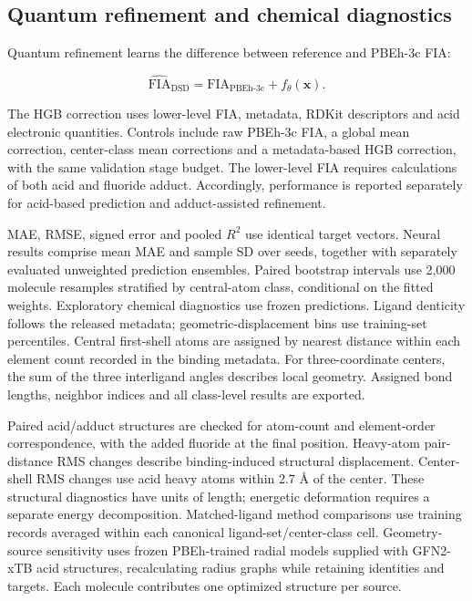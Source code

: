\subsection{Quantum refinement and chemical diagnostics}

Quantum refinement learns the difference between reference and PBEh-3c FIA:

\begin{equation}
\widehat{\mathrm{FIA}}_{\mathrm{DSD}}=\mathrm{FIA}_{\mathrm{PBEh\text{-}3c}}+f_{\theta}(\mathbf{x}).
\end{equation}

The HGB correction uses lower-level FIA, metadata, RDKit descriptors and acid electronic quantities. Controls include raw PBEh-3c FIA, a global mean correction, center-class mean corrections and a metadata-based HGB correction, with the same validation stage budget. The lower-level FIA requires calculations of both acid and fluoride adduct. Accordingly, performance is reported separately for acid-based prediction and adduct-assisted refinement.

MAE, RMSE, signed error and pooled $R^2$ use identical target vectors. Neural results comprise mean MAE and sample SD over seeds, together with separately evaluated unweighted prediction ensembles. Paired bootstrap intervals use 2,000 molecule resamples stratified by central-atom class, conditional on the fitted weights. Exploratory chemical diagnostics use frozen predictions. Ligand denticity follows the released metadata; geometric-displacement bins use training-set percentiles. Central first-shell atoms are assigned by nearest distance within each element count recorded in the binding metadata. For three-coordinate centers, the sum of the three interligand angles describes local geometry. Assigned bond lengths, neighbor indices and all class-level results are exported.

Paired acid/adduct structures are checked for atom-count and element-order correspondence, with the added fluoride at the final position. Heavy-atom pair-distance RMS changes describe binding-induced structural displacement. Center-shell RMS changes use acid heavy atoms within 2.7 Å of the center. These structural diagnostics have units of length; energetic deformation requires a separate energy decomposition. Matched-ligand method comparisons use training records averaged within each canonical ligand-set/center-class cell. Geometry-source sensitivity uses frozen PBEh-trained radial models supplied with GFN2-xTB acid structures, recalculating radius graphs while retaining identities and targets. Each molecule contributes one optimized structure per source.

